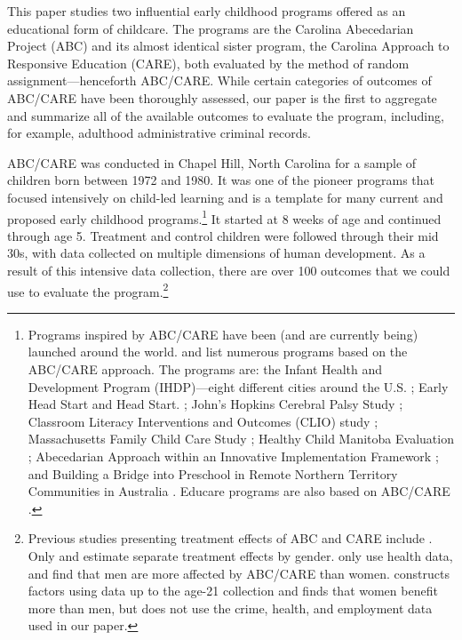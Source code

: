 This paper studies two influential early childhood programs offered as an educational form of childcare. The programs are the Carolina Abecedarian Project (ABC) and its almost identical sister program, the Carolina Approach to Responsive Education (CARE), both evaluated by the method of random assignment---henceforth ABC/CARE. While certain categories of outcomes of ABC/CARE have been thoroughly assessed, our paper is the first to aggregate and summarize all of the available outcomes to evaluate the program, including, for example, adulthood administrative criminal records.

ABC/CARE was conducted in Chapel Hill, North Carolina for a sample of children born between 1972 and 1980. It was one of the pioneer programs that focused intensively on child-led learning and is a template for many current and proposed early childhood programs.\footnote{Programs inspired by ABC/CARE have been (and are currently being) launched around the world. \citet{Sparling_2010_Highlights} and \citet{Ramey_Ramey_Lanzi_2014_Interventions} list numerous programs based on the ABC/CARE approach. The programs are: the Infant Health and Development Program (IHDP)---eight different cities around the U.S. \citep{Spiker-etal_1997_Helping}; Early Head Start and Head Start. \citep{Schneider_McDonald-eds_2007_Scale-Up_Vol-1}; John's Hopkins Cerebral Palsy Study \citep{Sparling_2010_Highlights}; Classroom Literacy Interventions and Outcomes (CLIO) study \citep{Sparling_2010_Highlights}; Massachusetts Family Child Care Study \citep{Collins_etal_2010_Massachusetts-Study}; Healthy Child Manitoba Evaluation \citep{Healthy_Child_Manitoba_2015_Starting-Early}; Abecedarian Approach within an Innovative Implementation Framework \citep{Jensen_Nielsen_2016_ABC-Programme-Pilot}; and Building a Bridge into Preschool in Remote Northern Territory Communities in Australia \citep{UMonash_Dataset_2015_URL}. Educare programs are also based on ABC/CARE \citep{Educare_2014_Research_Agenda,Yazejian_Bryant_2012_Educare}.} It started at 8 weeks of age and continued through age 5. Treatment and control children were followed through their mid 30s, with data collected on multiple dimensions of human development. As a result of this intensive data collection, there are over 100 outcomes that we could use to evaluate the program.\footnote{Previous studies presenting treatment effects of ABC and CARE include \citet{Ramey_etal_1985_Project-CARE_TiECSE,Clarke_Campbell_1998_ABC_Comparison_ECRQ,Campbell_Pungello_etal_2001_DP,Campbell_Ramey_etal_2002_ADS,Anderson_2008_JASA,Campbell_Wasik_etal_2008_ECRQ,Campbell_Conti_etal_2014_EarlyChildhoodInvestments}. Only \citet{Anderson_2008_JASA} and \citet{Campbell_Conti_etal_2014_EarlyChildhoodInvestments} estimate separate treatment effects by gender. \citet{Campbell_Conti_etal_2014_EarlyChildhoodInvestments} only use health data, and find that men are more affected by ABC/CARE than women. \citet{Anderson_2008_JASA} constructs factors using data up to the age-21 collection and finds that women benefit more than men, but does not use the crime, health, and employment data used in our paper. }

